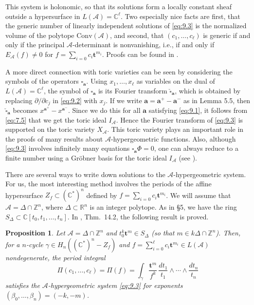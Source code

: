 \documentclass{amsart}
\theoremstyle{plain}
\newtheorem{proposition}[theorem]{Proposition}
\theoremstyle{definition}
\begin{document}
	This system is holonomic, so that its solutions form a locally
constant sheaf outside a hypersurface in $L(\mathcal{A}) = \mathbb{C}^\ell$.
Two especially nice facts are first, that the generic number of
linearly independent solutions of \eqref{eq:9.3} is the normalized
volume of the polytope $\mathrm{Conv}(\mathcal{A})$, and second, that
$(c_1,\dots,c_\ell)$ is generic if and only if the principal
$\mathcal{A}$-determinant is nonvanishing, i.e., if and only if
$E_{\mathcal{A}}(f) \ne 0$ for $f = \sum_{i=0} c_i \mathbf{t}^{m_i}$.
Proofs can be found in \cite{GKZ3}.

	A more direct connection with toric varieties can be seen by
considering the symbols of the operators $\square_{\mathbf{a}}$.  Using
$x_1,\dots,x_\ell$ as variables on the dual of $L(\mathcal{A}) = \mathbb{C}^\ell$, the symbol of $\square_{\mathbf{a}}$ is its Fourier transform
${\check \square}_{\mathbf{a}}$, which is obtained by replacing
$\partial/\partial c_j$ in \eqref{eq:9.2} with $x_j$.  If we write
$\mathbf{a} = \mathbf{a}^+ - \mathbf{a}^-$ as in Lemma 5.5, then ${\check
\square}_{\mathbf{a}}$ becomes $x^{\mathbf{a}^+} - x^{\mathbf{a}^-}$.  Since
we do this for all $\mathbf{a}$ satisfying \eqref{eq:9.1}, it follows from
\eqref{eq:7.5} that we get the toric ideal $I_{\mathcal{A}}$.  Hence the
Fourier transform of \eqref{eq:9.3} is supported on the toric variety
$X_{\mathcal{A}}$.  This toric variety plays an important role in the
proofs of many results about $\mathcal{A}$-hypergeometric functions.
Also, although \eqref{eq:9.3} involves infinitely many equations
$\square_{\mathbf{a}}\Phi =0$, one can always reduce to a finite number
using a Gr\"obner basis for the toric ideal $I_{\mathcal{A}}$ (see
\cite{HLY1}).

	There are several ways to write down solutions to the
$\mathcal{A}$-hypergeometric system.  For us, the most interesting method
involves the periods of the affine hypersurface $Z_f \subset (\mathbb{C}^*)^n$ defined by $f = \sum_{i=0} c_i \mathbf{t}^{m_i}$.  We will
assume that $\mathcal{A} = \Delta\cap\mathbb{Z}^n$, where $\Delta \subset
\mathbb{R}^n$ is an integer polytope.  As in \S5, we have the ring
$S_\Delta \subset \mathbb{C}[t_0,t_1,\dots,t_n]$.  In \cite{Bat4}, Thm.~14.2, the following result is proved.

\begin{proposition} Let $\mathcal{A} = \Delta\cap\mathbb{Z}^n$ and
$t_0^k\mathbf{t}^m \in S_\Delta$ (so that $m \in k\Delta\cap\mathbb{Z}^n$).
Then, for a $n$-cycle $\gamma \in H_n((\mathbb{C}^*)^n - Z_f)$ and $f =
\sum_{i=0}^\ell c_i \mathbf{t}^{m_i} \in L(\mathcal{A})$ nondegenerate, the
period integral
\[
\Pi(c_1,\dots,c_\ell) = \Pi(f) = \int_\gamma \frac{\mathbf{t}^m}{f^k}\,
\frac{dt_1}{t_1}\wedge \cdots \wedge \frac{dt_n}{t_n} 
\]
satisfies the $\mathcal{A}$-hypergeometric system \eqref{eq:9.3} for
exponents $(\beta_0,\dots,\beta_n) = (-k,-m)$.
\end{proposition}
\end{document}
